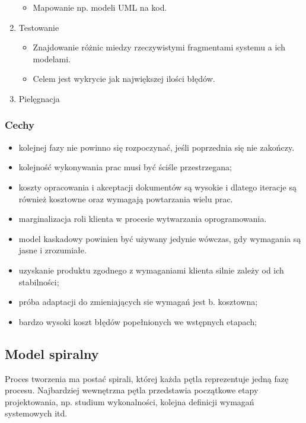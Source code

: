 \documentclass[12pt]{article}
\begin{document}
\begin{enumerate}
\begin{itemize}
            \item Mapowanie np. modeli UML na kod.
        \end{itemize}
        \item Testowanie
        \begin{itemize}
            \item Znajdowanie różnic miedzy rzeczywistymi fragmentami systemu a ich modelami.
            \item Celem jest wykrycie jak największej ilości błędów.
        \end{itemize}
        \item Pielęgnacja
    \end{enumerate}

    \subsubsection{Cechy}
    \begin{itemize}
        \item kolejnej fazy nie powinno się rozpoczynać, jeśli poprzednia
        się nie zakończy.
        \item kolejność wykonywania prac musi być ściśle przestrzegana;
        \item koszty opracowania i akceptacji dokumentów są wysokie i
        dlatego iteracje są również kosztowne oraz wymagają
        powtarzania wielu prac.
        \item marginalizacja roli klienta w procesie wytwarzania
        oprogramowania.
        \item model kaskadowy powinien być używany jedynie wówczas,
        gdy wymagania są jasne i zrozumiałe.
        \item uzyskanie produktu zgodnego z wymaganiami klienta silnie
        zależy od ich stabilności;
        \item próba adaptacji do zmieniających sie wymagań jest b.
        kosztowna;
        \item bardzo wysoki koszt błędów popełnionych we wstępnych
        etapach;
    \end{itemize}

    \subsection{Model spiralny}
    Proces tworzenia ma postać spirali, której każda pętla reprezentuje jedną fazę procesu. Najbardziej wewnętrzna pętla przedstawia początkowe etapy projektowania, np. studium wykonalności, kolejna definicji wymagań systemowych itd.
\end{document}
